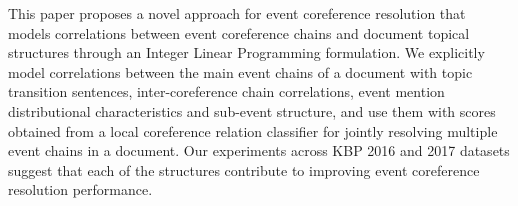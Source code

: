 This paper proposes a novel approach for event coreference resolution that models correlations between  event coreference chains and document topical structures through an Integer Linear Programming formulation. We explicitly model correlations between the main event chains of a document with topic transition sentences, inter-coreference chain correlations, event mention distributional characteristics and sub-event structure, and use them with scores obtained from a local coreference relation classifier for jointly resolving multiple event chains in a document. Our experiments across KBP 2016 and 2017 datasets suggest that each of the structures contribute to improving event coreference resolution performance.
